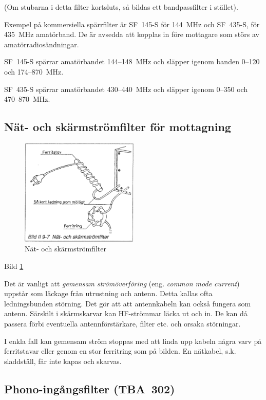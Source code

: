 (Om stubarna i detta filter kortsluts, så bildas ett bandpassfilter i
stället).

Exempel på kommersiella spärrfilter är SF~145-S för 144~MHz och
SF~435-S, för 435~MHz amatörband. De är avsedda att kopplas in före
mottagare som störs av amatörradiosändningar.

SF~145-S spärrar amatörbandet 144--148~MHz och släpper igenom banden
0--120 och 174--870~MHz.

SF~435-S spärrar amatörbandet 430--440~MHz och släpper igenom
0--350 och 470--870~MHz.

\subsection{Nät- och skärmströmfilter för mottagning}

\begin{figure}
  \includegraphics[width=0.5\textwidth]{images/bild_2_9-07}
  \caption{Nät- och skärmströmfilter}
  \label{fig:bildII9-7}
\end{figure}

Bild \ref{fig:bildII9-7}

Det är vanligt att \emph{gemensam strömöverföring} (eng.
\emph{common mode current}) uppstår som läckage från utrustning och antenn.
Detta kallas ofta ledningsbunden störning.
Det gör att att antennkabeln kan också fungera som antenn. Särskilt
i skärmskarvar kan HF-strömmar läcka ut och in. De kan då passera förbi
eventuella antennförstärkare, filter etc. och orsaka störningar.

I enkla fall kan gemensam ström stoppas med att linda upp kabeln
några varv på ferritstavar eller genom en stor ferritring som på
bilden. En nätkabel, s.k. sladdställ, får inte kapas och skarvas.

\subsection{Phono-ingångsfilter (TBA~302)}

